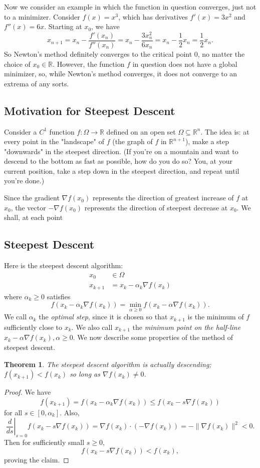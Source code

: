 \documentclass[11pt]{article}
\newcommand{\R}{\mathbb{R}}
\newtheorem{theorem}{Theorem}[section]
\begin{document}
Now we consider an example in which the function in question converges, just not to a minimizer. Consider $f(x) = x^3$, which has derivatives $f'(x) = 3x^2$ and $f''(x) = 6x$. Starting at $x_0$, we have
\[
x_{n+1} = x_n - \frac{f'(x_n)}{f''(x_n)} = x_n - \frac{3x_n^2}{6x_n} = x_n - \frac{1}{2}x_n = \frac{1}{2}x_n.
\]
So Newton's method definitely converges to the critical point $0$, no matter the choice of $x_0 \in \R$. However, the function $f$ in question does not have a global minimizer, so, while Newton's method converges, it does not converge to an extrema of any sorts.

\subsection{Motivation for Steepest Descent}

Consider a $C^1$ function $f : \Omega \to \R$ defined on an open set $\Omega \subseteq \R^n$. The idea is: at every point in the "landscape" of $f$ (the graph of $f$ in $\R^{n+1}$), make a step "downwards" in the steepest direction. (If you're on a mountain and want to descend to the bottom as fast as possible, how do you do so? You, at your current position, take a step down in the steepest direction, and repeat until you're done.) 

Since the gradient $\nabla f(x_0)$ represents the direction of greatest increase of $f$ at $x_0$, the vector $-\nabla f(x_0)$ represents the direction of steepest decrease at $x_0$. We shall, at each point 

\subsection{Steepest Descent}

Here is the steepest descent algorithm:
\begin{align*}
x_0 &\in \Omega \\
x_{k+1} &= x_k - \alpha_k \nabla f(x_k)
\end{align*}
where $\alpha_k \geq 0$ satisfies 
\[
f(x_k - \alpha_k \nabla f(x_k)) = \min_{\alpha \geq 0} f(x_k - \alpha \nabla f(x_k)).
\]
We call $\alpha_k$ the \emph{optimal step}, since it is chosen so that $x_{k+1}$ is the minimum of $f$ sufficiently close to $x_k$. We also call $x_{k+1}$ the \emph{minimum point on the half-line} $x_k - \alpha \nabla f(x_k), \alpha \geq 0$. We now describe some properties of the method of steepest descent.

\begin{theorem}
The steepest descent algorithm is actually descending; $f(x_{k+1}) < f(x_k)$ so long as $\nabla f(x_k) \neq 0$.
\end{theorem}
\begin{proof}
We have
\[
f(x_{k+1}) = f(x_k - \alpha_k \nabla f(x_k)) \leq f(x_k - s \nabla f(x_k))
\]
for all $s \in [0, \alpha_k]$. Also,
\[
\left. \frac{d}{ds} \right|_{s=0} f(x_k - s\nabla f(x_k)) = \nabla f(x_k) \cdot (-\nabla f(x_k)) = -\| \nabla f(x_k) \|^2 < 0.
\]
Then for sufficiently small $s \geq 0$,
\[
f(x_k - s\nabla f(x_k)) < f(x_k),
\]
proving the claim.
\end{proof}
\end{document}
